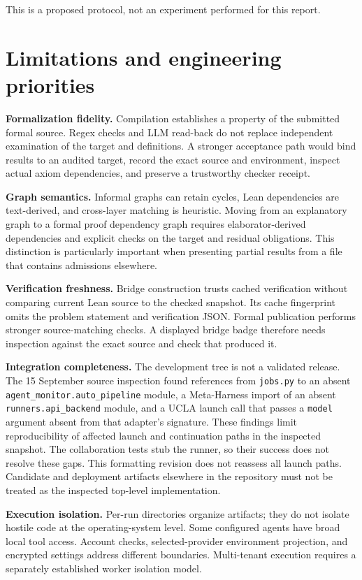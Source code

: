 \documentclass[10pt,letterpaper]{article}
\begin{document}
This is a proposed protocol, not an experiment performed for this report.

\section{Limitations and engineering priorities}

\textbf{Formalization fidelity.} Compilation establishes a property of the submitted formal source. Regex checks and LLM read-back do not replace independent examination of the target and definitions. A stronger acceptance path would bind results to an audited target, record the exact source and environment, inspect actual axiom dependencies, and preserve a trustworthy checker receipt.

\textbf{Graph semantics.} Informal graphs can retain cycles, Lean dependencies are text-derived, and cross-layer matching is heuristic. Moving from an explanatory graph to a formal proof dependency graph requires elaborator-derived dependencies and explicit checks on the target and residual obligations. This distinction is particularly important when presenting partial results from a file that contains admissions elsewhere.

\textbf{Verification freshness.} Bridge construction trusts cached verification without comparing current Lean source to the checked snapshot. Its cache fingerprint omits the problem statement and verification JSON. Formal publication performs stronger source-matching checks. A displayed bridge badge therefore needs inspection against the exact source and check that produced it.

\textbf{Integration completeness.} The development tree is not a validated release. The 15 September source inspection found references from \nolinkurl{jobs.py} to an absent \nolinkurl{agent_monitor.auto_pipeline} module, a Meta-Harness import of an absent \nolinkurl{runners.api_backend} module, and a UCLA launch call that passes a \nolinkurl{model} argument absent from that adapter's signature. These findings limit reproducibility of affected launch and continuation paths in the inspected snapshot. The collaboration tests stub the runner, so their success does not resolve these gaps. This formatting revision does not reassess all launch paths. Candidate and deployment artifacts elsewhere in the repository must not be treated as the inspected top-level implementation.

\textbf{Execution isolation.} Per-run directories organize artifacts; they do not isolate hostile code at the operating-system level. Some configured agents have broad local tool access. Account checks, selected-provider environment projection, and encrypted settings address different boundaries. Multi-tenant execution requires a separately established worker isolation model.
\end{document}
